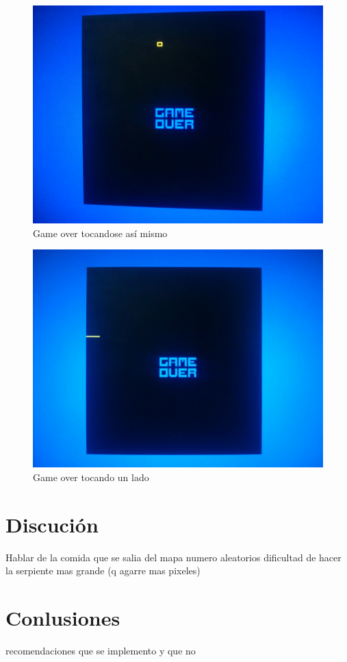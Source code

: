 \documentclass[10pt]{article}
\begin{document}
\begin{figure}[hbtp]
\centering
\includegraphics[width=1\textwidth]{game-over}
\caption{Game over tocandose así mismo}
\label{vga-over}
\end{figure}

\begin{figure}[hbtp]
\centering
\includegraphics[width=1\textwidth]{game-over-side}
\caption{Game over tocando un lado}
\label{vga-over-side}
\end{figure}

\section{Discución}
Hablar de la comida que se salia del mapa
numero aleatorios
dificultad de hacer la serpiente mas grande (q agarre mas pixeles)
\section{Conlusiones}
recomendaciones
que se implemento y que no


\end{document}

